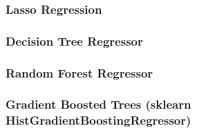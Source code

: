 \documentclass[11pt,a4paper]{article}
\begin{document}

\subsubsection{Lasso Regression}

\subsubsection{Decision Tree Regressor}

\subsubsection{Random Forest Regressor}

\subsubsection{Gradient Boosted Trees (sklearn HistGradientBoostingRegressor)}
\end{document}
